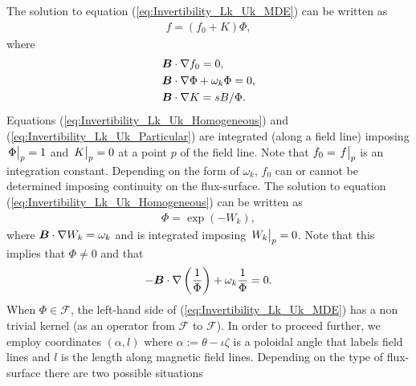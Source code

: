 The solution to equation (\ref{eq:Invertibility_Lk_Uk_MDE}) can be written as
%
\begin{align}
	f = (f_0 + K ) \Phi,
	\label{eq:Invertibility_Lk_Uk_Variation_of Constants}
\end{align}
where
%
\begin{align}
	& \vb*{B}\cdot \nabla f_0 = 0,  \label{eq:Invertibility_Lk_Uk_constant}
	\\
	& \vb*{B}\cdot \nabla \Phi + \omega_k \Phi = 0,  \label{eq:Invertibility_Lk_Uk_Homogeneous}
	\\
	& \vb*{B}\cdot \nabla K = {sB}/{\Phi}.  \label{eq:Invertibility_Lk_Uk_Particular}
\end{align}
Equations (\ref{eq:Invertibility_Lk_Uk_Homogeneous}) and (\ref{eq:Invertibility_Lk_Uk_Particular}) are integrated (along a field line) imposing $\eval{\Phi}_{p}=1$ and $\eval{K}_{p}=0$ at a point $p$ of the field line. Note that $f_0=\eval{f}_{p}$ is an integration constant. Depending on the form of $\omega_k$, $f_0$ can or cannot be determined imposing continuity on the flux-surface. The solution to equation (\ref{eq:Invertibility_Lk_Uk_Homogeneous}) can be written as
%
\begin{align}
	\Phi = \exp(-W_k), 
	\label{eq:Invertibility_Lk_Uk_Homogeneous_solution}
\end{align}
where $\vb*{B}\cdot\nabla W_k = \omega_k$ and is integrated imposing $\eval{W_k}_{p}=0$. Note that this implies that $\Phi\ne 0$ and that 
\begin{align}
	- \vb*{B}\cdot \nabla \left(\frac{1}{\Phi}\right) + \omega_k \frac{1}{\Phi} = 0.
	\label{eq:Invertibility_Lk_Uk_Adjoint_kernel}
\end{align}
When $\Phi\in\mathcal{F}$, the left-hand side of (\ref{eq:Invertibility_Lk_Uk_MDE}) has a non trivial kernel (as an operator from $\mathcal{F}$ to $\mathcal{F}$). In order to proceed further, we employ coordinates $(\alpha,l)$ where $\alpha:=\theta-\iota \zeta$ is a poloidal angle that labels field lines and $l$ is the length along magnetic field lines. Depending on the type of flux-surface there are two possible situations
%
